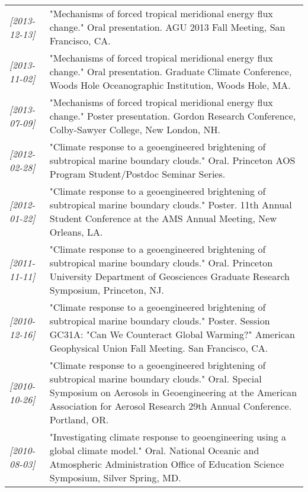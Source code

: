 \documentclass[12pt,letterpaper]{shillcv}
\begin{document}
\begin{center}
\begin{tabularx}{\textwidth}{lX}
\textit{[2013-12-13]} & "Mechanisms of forced tropical meridional energy flux change."  Oral presentation.  AGU 2013 Fall Meeting, San Francisco, CA.\\
\textit{[2013-11-02]} & "Mechanisms of forced tropical meridional energy flux change."  Oral presentation.  Graduate Climate Conference, Woods Hole Oceanographic Institution, Woods Hole, MA.\\
\textit{[2013-07-09]} & "Mechanisms of forced tropical meridional energy flux change."  Poster presentation.  Gordon Research Conference, Colby-Sawyer College, New London, NH.\\
\textit{[2012-02-28]} & "Climate response to a geoengineered brightening of subtropical marine boundary clouds."  Oral.  Princeton AOS Program Student/Postdoc Seminar Series.\\
\textit{[2012-01-22]} & "Climate response to a geoengineered brightening of subtropical marine boundary clouds."  Poster.  11th Annual Student Conference at the AMS Annual Meeting, New Orleans, LA.\\
\textit{[2011-11-11]} & "Climate response to a geoengineered brightening of subtropical marine boundary clouds."  Oral.  Princeton University Department of Geosciences Graduate Research Symposium, Princeton, NJ.\\
\textit{[2010-12-16]} & "Climate response to a geoengineered brightening of subtropical marine boundary clouds."  Poster.  Session GC31A: "Can We Counteract Global Warming?" American Geophysical Union Fall Meeting.  San Francisco, CA.\\
\textit{[2010-10-26]} & "Climate response to a geoengineered brightening of subtropical marine boundary clouds."  Oral.  Special Symposium on Aerosols in Geoengineering at the American Association for Aerosol Research 29th Annual Conference.  Portland, OR.\\
\textit{[2010-08-03]} & "Investigating climate response to geoengineering using a global climate model."  Oral.  National Oceanic and Atmospheric Administration Office of Education Science Symposium, Silver Spring, MD.\\
\end{tabularx}
\end{center}
\end{document}
